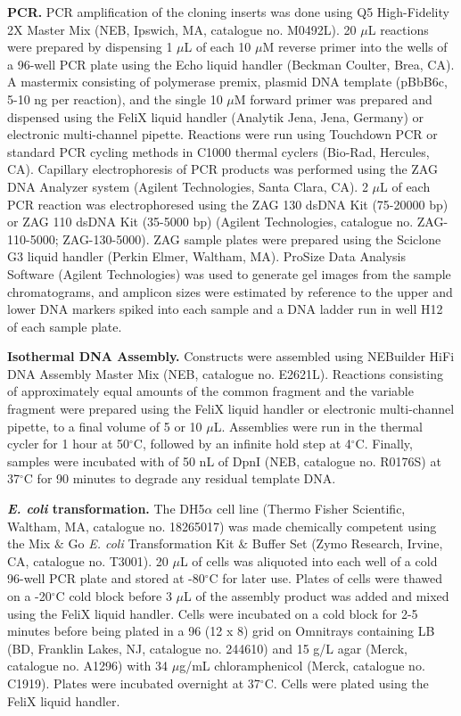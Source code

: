 \documentclass{scrartcl}[2013/05/29]%
\begin{document}
\textbf{PCR.}
PCR amplification of the cloning inserts was done using Q5 High-Fidelity 2X Master Mix (NEB, Ipswich, MA, catalogue no. M0492L).
20 $\mu$L reactions were prepared by dispensing 1 $\mu$L of each 10 $\mu$M reverse primer into the wells of a 96-well PCR plate using the Echo liquid handler (Beckman Coulter, Brea, CA).
A mastermix consisting of polymerase premix, plasmid DNA template (pBbB6c, 5-10 ng per reaction), and the single 10 $\mu$M forward primer was prepared and dispensed using the FeliX liquid handler (Analytik Jena, Jena, Germany) or electronic multi-channel pipette. Reactions were run using Touchdown PCR or standard PCR cycling methods in C1000 thermal cyclers (Bio-Rad, Hercules, CA).
Capillary electrophoresis of PCR products was performed using the ZAG DNA Analyzer system (Agilent Technologies, Santa Clara, CA).
2 $\mu$L of each PCR reaction was electrophoresed using the ZAG 130 dsDNA Kit (75-20000 bp) or ZAG 110 dsDNA Kit (35-5000 bp) (Agilent Technologies, catalogue no. ZAG-110-5000; ZAG-130-5000). ZAG sample plates were prepared using the Sciclone G3 liquid handler (Perkin Elmer, Waltham, MA).
ProSize Data Analysis Software (Agilent Technologies) was used to generate gel images from the sample chromatograms, and amplicon sizes were estimated by reference to the upper and lower DNA markers spiked into each sample and a DNA ladder run in well H12 of each sample plate. 


\textbf{Isothermal DNA Assembly.}
Constructs were assembled using NEBuilder HiFi DNA Assembly Master Mix (NEB, catalogue no. E2621L).
Reactions consisting of approximately equal amounts of the common fragment and the variable fragment were prepared using the FeliX liquid handler or electronic multi-channel pipette, to a final volume of 5 or 10 $\mu$L.
Assemblies were run in the thermal cycler for 1 hour at 50$^{\circ}$C, followed by an infinite hold step at 4$^{\circ}$C.
Finally, samples were incubated with of 50 nL of DpnI (NEB, catalogue no. R0176S) at 37$^{\circ}$C for 90 minutes to degrade any residual template DNA.

\textbf{\textit{E. coli} transformation.}
The DH5$\alpha$ cell line (Thermo Fisher Scientific, Waltham, MA, catalogue no. 18265017) was made chemically competent using the Mix $\&$ Go \textit{E. coli} Transformation Kit $\&$ Buffer Set (Zymo Research, Irvine, CA, catalogue no. T3001).
20 $\mu$L of cells was aliquoted into each well of a cold 96-well PCR plate and stored at -80$^{\circ}$C for later use.
Plates of cells were thawed on a -20$^{\circ}$C cold block before 3 $\mu$L of the assembly product was added and mixed using the FeliX liquid handler.
Cells were incubated on a cold block for 2-5 minutes before being plated in a 96 (12 x 8) grid on Omnitrays containing LB (BD, Franklin Lakes, NJ, catalogue no. 244610) and 15 g/L agar (Merck, catalogue no. A1296) with 34 $\mu$g/mL chloramphenicol (Merck, catalogue no. C1919).
Plates were incubated overnight at 37$^{\circ}$C. Cells were plated using the FeliX liquid handler.
\end{document}
